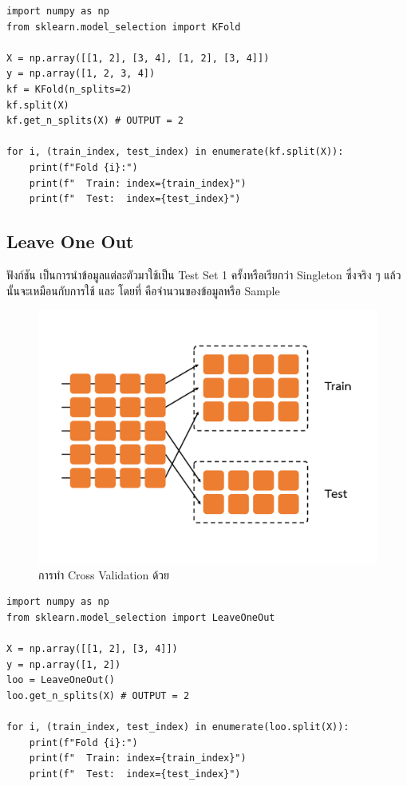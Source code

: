 \begin{lstlisting}[style=MyPython]
import numpy as np
from sklearn.model_selection import KFold

X = np.array([[1, 2], [3, 4], [1, 2], [3, 4]])
y = np.array([1, 2, 3, 4])
kf = KFold(n_splits=2)
kf.split(X)
kf.get_n_splits(X) # OUTPUT = 2

for i, (train_index, test_index) in enumerate(kf.split(X)):
    print(f"Fold {i}:")
    print(f"  Train: index={train_index}")
    print(f"  Test:  index={test_index}")
\end{lstlisting}

\subsection{Leave One Out}
\label{ssec:leave_one_out}

ฟังก์ชัน  เป็นการนำข้อมูลแต่ละตัวมาใช้เป็น Test Set 1 ครั้งหรือเรียกว่า Singleton ซึ่งจริง ๆ แล้ว 
 นั้นจะเหมือนกับการใช้  และ  โดยที่ 
 คือจำนวนของข้อมูลหรือ Sample

\begin{figure}[H]
    \centering
    \includegraphics[width=0.9\linewidth,page=5]{fig/cross_validation.pdf}
    \caption{การทำ Cross Validation ด้วย }
    \label{fig:leave_one_out}
\end{figure}

\begin{lstlisting}[style=MyPython]
import numpy as np
from sklearn.model_selection import LeaveOneOut

X = np.array([[1, 2], [3, 4]])
y = np.array([1, 2])
loo = LeaveOneOut()
loo.get_n_splits(X) # OUTPUT = 2 

for i, (train_index, test_index) in enumerate(loo.split(X)):
    print(f"Fold {i}:")
    print(f"  Train: index={train_index}")
    print(f"  Test:  index={test_index}")
\end{lstlisting}

